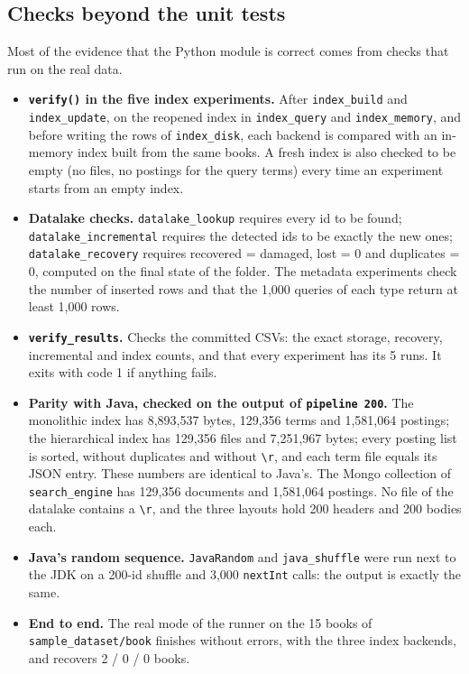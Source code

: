 \documentclass[11pt,a4paper]{article}
\newcommand{\code}[1]{\texttt{#1}}
\begin{document}
\subsection{Checks beyond the unit tests}\label{sec:checks}
Most of the evidence that the Python module is correct comes from checks that run on the real data.
\begin{itemize}
  \item \textbf{\code{verify()} in the five index experiments.} After \code{index\_build} and
        \code{index\_update}, on the reopened index in \code{index\_query} and \code{index\_memory},
        and before writing the rows of \code{index\_disk}, each backend is compared with an
        in-memory index built from the same books. A fresh index is also checked to be empty
        (no files, no postings for the query terms) every time an experiment starts from an empty index.
  \item \textbf{Datalake checks.} \code{datalake\_lookup} requires every id to be found;
        \code{datalake\_incremental} requires the detected ids to be exactly the new ones;
        \code{datalake\_recovery} requires recovered = damaged, lost = 0 and duplicates = 0, computed
        on the final state of the folder. The metadata experiments check the number of inserted
        rows and that the 1,000 queries of each type return at least 1,000 rows.
  \item \textbf{\code{verify\_results}.} Checks the committed CSVs: the exact storage, recovery,
        incremental and index counts, and that every experiment has its 5 runs. It exits with code
        1 if anything fails.
  \item \textbf{Parity with Java, checked on the output of \code{pipeline 200}.} The monolithic
        index has 8,893,537 bytes, 129,356 terms and 1,581,064 postings; the hierarchical index has
        129,356 files and 7,251,967 bytes; every posting list is sorted, without duplicates and
        without \code{\textbackslash r}, and each term file equals its JSON entry. These numbers are
        identical to Java's. The Mongo collection of \code{search\_engine} has 129,356 documents and
        1,581,064 postings. No file of the datalake contains a \code{\textbackslash r}, and the three
        layouts hold 200 headers and 200 bodies each.
  \item \textbf{Java's random sequence.} \code{JavaRandom} and \code{java\_shuffle} were run next to
        the JDK on a 200-id shuffle and 3,000 \code{nextInt} calls: the output is exactly the same.
  \item \textbf{End to end.} The real mode of the runner on the 15 books of
        \code{sample\_dataset/book} finishes without errors, with the three index backends, and
        recovers 2 / 0 / 0 books.
\end{itemize}
\end{document}
